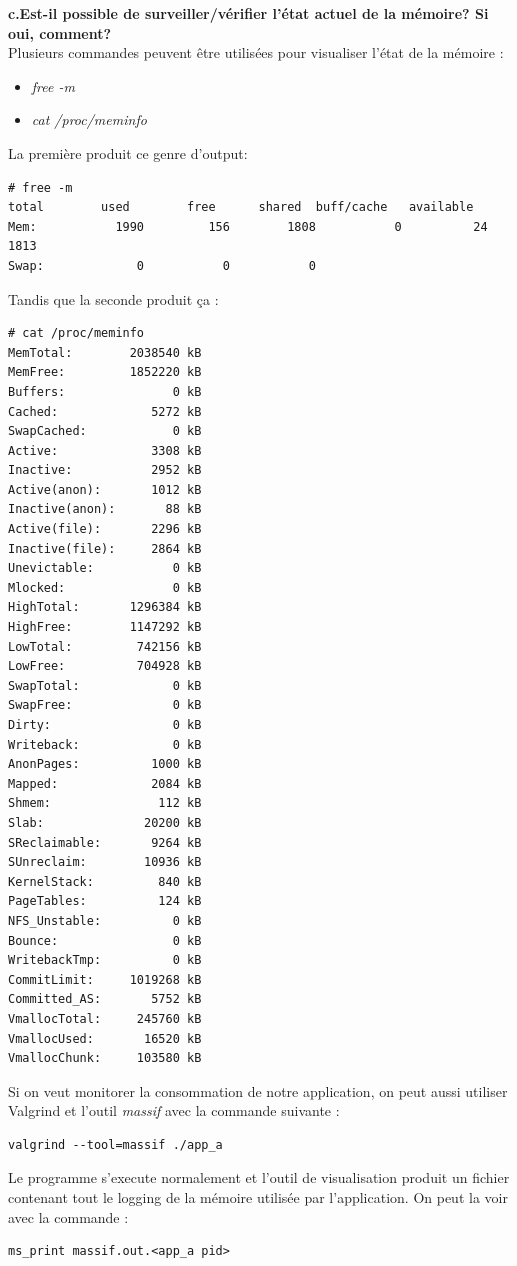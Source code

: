\textbf{c.Est-il possible de surveiller/vérifier l'état actuel de la mémoire? Si oui, comment?}\\
Plusieurs commandes peuvent être utilisées pour visualiser l'état de la mémoire :
\begin{itemize}
	\item \textit{free -m}
	\item \textit{cat /proc/meminfo}
\end{itemize}
La première produit ce genre d'output:
\begin{lstlisting}
# free -m
total        used        free      shared  buff/cache   available
Mem:           1990         156        1808           0          24        1813
Swap:             0           0           0
\end{lstlisting}
Tandis que la seconde produit ça :
\begin{lstlisting}
# cat /proc/meminfo 
MemTotal:        2038540 kB
MemFree:         1852220 kB
Buffers:               0 kB
Cached:             5272 kB
SwapCached:            0 kB
Active:             3308 kB
Inactive:           2952 kB
Active(anon):       1012 kB
Inactive(anon):       88 kB
Active(file):       2296 kB
Inactive(file):     2864 kB
Unevictable:           0 kB
Mlocked:               0 kB
HighTotal:       1296384 kB
HighFree:        1147292 kB
LowTotal:         742156 kB
LowFree:          704928 kB
SwapTotal:             0 kB
SwapFree:              0 kB
Dirty:                 0 kB
Writeback:             0 kB
AnonPages:          1000 kB
Mapped:             2084 kB
Shmem:               112 kB
Slab:              20200 kB
SReclaimable:       9264 kB
SUnreclaim:        10936 kB
KernelStack:         840 kB
PageTables:          124 kB
NFS_Unstable:          0 kB
Bounce:                0 kB
WritebackTmp:          0 kB
CommitLimit:     1019268 kB
Committed_AS:       5752 kB
VmallocTotal:     245760 kB
VmallocUsed:       16520 kB
VmallocChunk:     103580 kB
\end{lstlisting}
Si on veut monitorer la consommation de notre application, on peut aussi utiliser Valgrind et l'outil \textit{massif} avec la commande suivante : 
\begin{lstlisting}
valgrind --tool=massif ./app_a
\end{lstlisting}
Le programme s'execute normalement et l'outil de visualisation produit un fichier contenant tout le logging de la mémoire utilisée par l'application. On peut la voir avec la commande :
\begin{lstlisting}
ms_print massif.out.<app_a pid>
\end{lstlisting}
